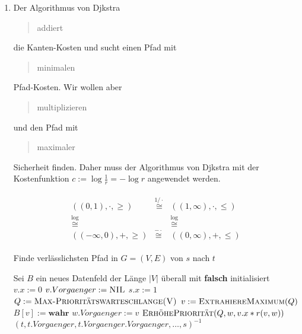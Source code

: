 \begin{solution}

\begin{enumerate}[label = \alph*]

    \item \phantom{}


    Der Algorithmus von Djkstra \blockquote{addiert} die Kanten-Kosten und sucht einen Pfad mit \blockquote{minimalen} Pfad-Kosten.
    Wir wollen aber \blockquote{multiplizieren} und den Pfad mit \blockquote{maximaler} Sicherheit finden.
    Daher muss der Algorithmus von Djkstra mit der Kostenfunktion $c := \log \frac{1}{r} = -\log r$ angewendet werden.

    \begin{align*}
        \begin{matrix}
            ((0, 1), \cdot, \geq)   & \stackrel{1 / \cdot}{\cong} & ((1, \infty), \cdot, \leq) \\
            \stackrel{\log}{\cong}  &                             & \stackrel{\log}{\cong}     \\
            ((-\infty, 0), +, \geq) & \stackrel{- \cdot}{\cong}   & ((0, \infty), +, \leq)
        \end{matrix}
    \end{align*}

    \begin{algorithm}
    	\caption{Finde verlässlichsten Pfad in $G = (V, E)$ von $s$ nach $t$}
    	\begin{algorithmic}[1]
    		\State Sei $B$ ein neues Datenfeld der Länge $|V|$ überall mit \textbf{falsch} initialisiert
	    		\State $v.x := 0$
	    		\State $v.Vorgaenger := \textsc{NIL}$
    		\EndFor
    		\State $s.x := 1$
    		\State $Q := \textsc{Max-Prioritätswarteschlange(V)}$
	    		\State $v := \textsc{ExtrahiereMaximum}(Q)$
	    		\State $B[v] := \textbf{wahr}$
			    		\State $w.Vorgaenger := v$
			    		\State $\textsc{ErhöhePriorität}(Q,w,v.x \ast r(v,w))$
		    		\EndIf
	    		\EndFor
    		\EndWhile
    		\State \Return $(t, t.Vorgaenger, t.Vorgaenger.Vorgaenger, \dots, s)^{-1}$
    		\EndProcedure
    	\end{algorithmic}
    \end{algorithm}


\end{enumerate}
\end{solution}
